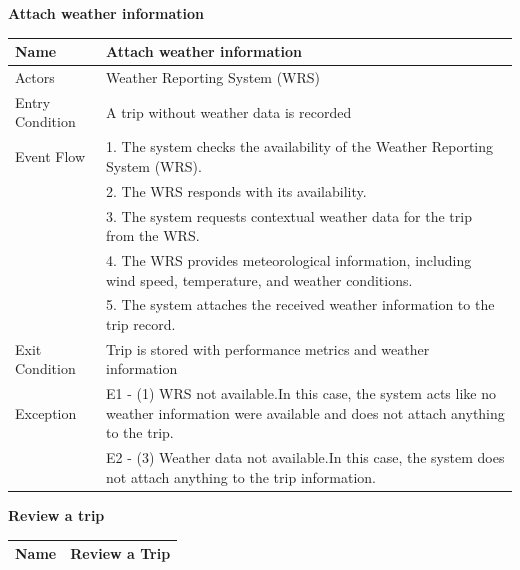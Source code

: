 \begin{enumerate}[label=\textbf{[UC\arabic*]}]
    \item \textbf{Attach weather information} 
        \begin{center}
            \begin{tabular}{|p{4cm}|p{11cm}|}
                \hline
                \textbf{Name} & \textbf{Attach weather information} \\
                \hline
                Actors & Weather Reporting System (WRS) \\
                \hline
                Entry Condition & A trip without weather data is recorded \\
                \hline
                Event Flow & 1. The system checks the availability of the Weather Reporting System (WRS). \\
                & 2. The WRS responds with its availability. \\
                & 3. The system requests contextual weather data for the trip from the WRS. \\
                & 4. The WRS provides meteorological information, including wind speed, temperature, and weather conditions. \\
                & 5. The system attaches the received weather information to the trip record. \\
                \hline
                Exit Condition & Trip is stored with performance metrics and weather information \\
                \hline
                Exception & E1 - (1) WRS not available.\newline In this case, the system acts like no weather information were available and does not attach anything to the trip. \\
                & E2 - (3) Weather data not available.\newline In this case, the system does not attach anything to the trip information.\\
                \hline
            \end{tabular}
        \end{center}
\newpage
    \item \textbf{Review a trip} 
        \begin{center}
            \begin{tabular}{|p{4cm}|p{11cm}|}
                \hline
                \textbf{Name} & \textbf{Review a Trip} \\
                \hline

\end{tabular}
\end{center}
\end{enumerate}
